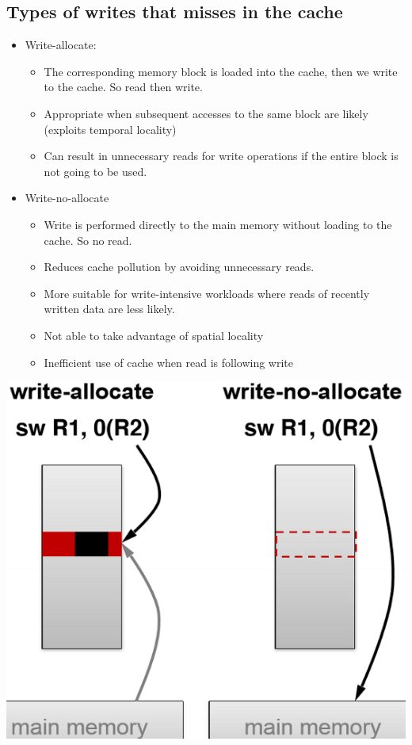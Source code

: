 \documentclass[letterpaper,12pt]{article}
\begin{document}
\subsection{Types of writes that misses in the cache}
\begin{itemize}
    \item Write-allocate:
          \begin{itemize}
              \item The corresponding memory block is loaded into the cache, then we write to the cache. So read then write.
              \item Appropriate when subsequent accesses to the same block are likely (exploits temporal locality)
              \item Can result in unnecessary reads for write operations if the entire block is not going to be used.
          \end{itemize}
    \item Write-no-allocate
          \begin{itemize}
              \item Write is performed directly to the main memory without loading to the cache. So no read.
              \item Reduces cache pollution by avoiding unnecessary reads.
              \item More suitable for write-intensive workloads where reads of recently written data are less likely.
              \item Not able to take advantage of spatial locality
              \item Inefficient use of cache when read is following write
          \end{itemize}
\end{itemize}
\includegraphics*{./Image/Write that miss.png}
\end{document}
